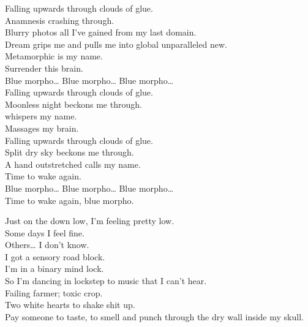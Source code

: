 


Falling upwards through clouds of glue. \\
Anamnesis crashing through. \\
Blurry photos all I've gained from my last domain. \\

Dream grips me and pulls me into global unparalleled new. \\
Metamorphic is my name. \\
Surrender this brain. \\

Blue morpho… Blue morpho… Blue morpho… \\

Falling upwards through clouds of glue. \\
Moonless night beckons me through. \\
 whispers my name. \\
Massages my brain. \\

Falling upwards through clouds of glue. \\
Split dry sky beckons me through. \\
A hand outstretched calls my name. \\
Time to wake again. \\

Blue morpho… Blue morpho… Blue morpho… \\

Time to wake again, blue morpho. \\




Just on the down low, I'm feeling pretty low. \\
Some days I feel fine. \\
Others… I don't know. \\
I got a sensory road block. \\
I'm in a binary mind lock. \\
So I'm dancing in lockstep to music that I can't hear. \\

Failing farmer; toxic crop. \\
Two white hearts to shake shit up. \\
Pay someone to taste, to smell and punch through the dry wall inside my skull. \\

